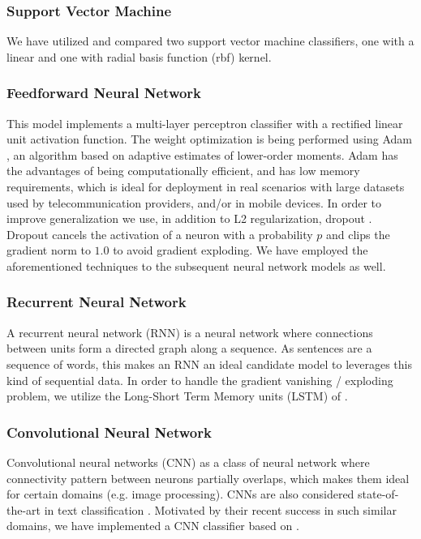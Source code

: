 \documentclass[letterpaper]{article}
\begin{document}
\subsubsection{Support Vector Machine}  \label{Support Vector Machine}

We have utilized and compared two support vector machine classifiers, one with a linear and one with radial basis function (rbf) kernel. 

\subsubsection{Feedforward Neural Network}  \label{Feedforward Neural Network}

This model implements a multi-layer perceptron classifier with a rectified linear unit activation function. The weight optimization is being performed using Adam \cite{DBLP:journals/corr/KingmaB14}, an algorithm based on adaptive estimates of lower-order moments. Adam has the advantages of being computationally efficient, and has low memory requirements, which is ideal for deployment in real scenarios with large datasets used by telecommunication providers, and/or in mobile devices. In order to improve generalization we use, in addition to L2 regularization, dropout \cite{Srivastava2014}. Dropout cancels the activation of a neuron with a probability $p$ and clips the gradient norm to $1.0$ to avoid gradient exploding. We have employed the aforementioned techniques to the subsequent neural network models as well.

\subsubsection{Recurrent Neural Network} \label{Recurrent Neural Network}

A recurrent neural network (RNN) is a neural network where connections between units form a directed graph along a sequence. As sentences are a sequence of words, this makes an RNN an ideal candidate model to leverages this kind of sequential data. In order to handle the gradient vanishing / exploding problem, we utilize the Long-Short Term Memory units (LSTM) of \cite{hochreiter1997long}.

\subsubsection{Convolutional Neural Network} \label{Convolutional Neural Network}

Convolutional neural networks (CNN) as a class of neural network where connectivity pattern between neurons partially overlaps, which makes them ideal for certain domains (e.g. image processing). CNNs are also considered state-of-the-art in text classification \cite{CaoLLW17} \cite{kim2014convolutional} \cite{zhang2015understanding} \cite{XiaoC16}. Motivated by their recent success in such similar domains, we have implemented a CNN classifier based on \cite{kim2014convolutional}.
\end{document}
